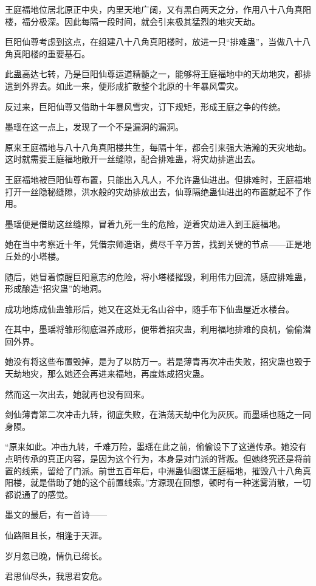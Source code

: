 \begin{this_body}
王庭福地位居北原正中央，内里天地广阔，又有黑白两天之分，作用八十八角真阳楼，福分极深。因此每隔一段时间，就会引来极其猛烈的地灾天劫。

巨阳仙尊考虑到这点，在组建八十八角真阳楼时，放进一只“排难蛊”，当做八十八角真阳楼的重要基石。

此蛊高达七转，乃是巨阳仙尊运道精髓之一，能够将王庭福地中的天劫地灾，都排遣到外界去。如此一来，便形成扩散整个北原的十年暴风雪灾。

反过来，巨阳仙尊又借助十年暴风雪灾，订下规矩，形成王庭之争的传统。

墨瑶在这一点上，发现了一个不是漏洞的漏洞。

原来王庭福地与八十八角真阳楼共生，每隔十年，都会引来强大浩瀚的天灾地劫。这时就需要王庭福地敞开一丝缝隙，配合排难蛊，将灾劫排遣出去。

王庭福地被巨阳仙尊布置，只能出入凡人，不允许蛊仙进出。但排难时，王庭福地打开一丝隐秘缝隙，洪水般的灾劫排放出去，仙尊隔绝蛊仙进出的布置就起不了作用。

墨瑶便是借助这丝缝隙，冒着九死一生的危险，逆着灾劫进入到王庭福地。

她在当中考察近十年，凭借宗师造诣，费尽千辛万苦，找到关键的节点——正是地丘处的小塔楼。

随后，她冒着惊醒巨阳意志的危险，将小塔楼摧毁，利用伟力回流，感应排难蛊，形成酿造“招灾蛊”的地洞。

成功地炼成仙蛊雏形后，她又在这处无名山谷中，随手布下仙蛊屋近水楼台。

在其中，墨瑶将雏形彻底温养成形，便带着招灾蛊，利用福地排难的良机，偷偷潜回外界。

她没有将这些布置毁掉，是为了以防万一。若是薄青再次冲击失败，招灾蛊也毁于天劫地灾，那么她还会再进来福地，再度炼成招灾蛊。

然而这一次出去，她就再也没有回来。

剑仙薄青第二次冲击九转，彻底失败，在浩荡天劫中化为灰灰。而墨瑶也随之一同身陨。

“原来如此。冲击九转，千难万险，墨瑶在此之前，偷偷设下了这道传承。她没有点明传承的真正内容，是因为这个行为，本身是对门派的背叛。但她终究还是将前置的线索，留给了门派。前世五百年后，中洲蛊仙图谋王庭福地，摧毁八十八角真阳楼，就是借助了她的这个前置线索。”方源现在回想，顿时有一种迷雾消散，一切都说通了的感觉。

墨文的最后，有一首诗——

仙路阻且长，相逢于天涯。

岁月忽已晚，情仇已绵长。

君思仙尽头，我思君安危。


\end{this_body}
